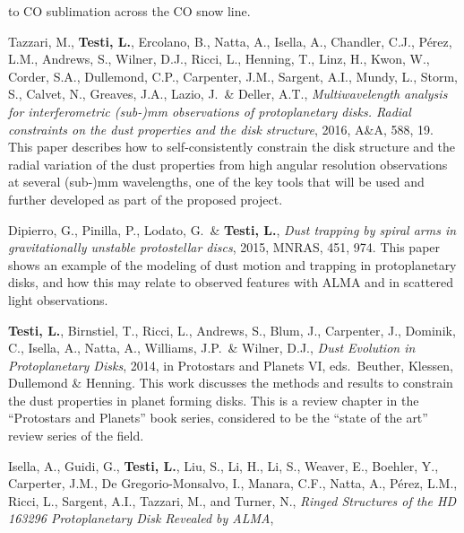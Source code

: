 \documentclass[10pt,fleqn,twoside]{article}
\begin{document}
\begin{literature}
  to CO sublimation across the CO snow line.
\item Tazzari, M., {\bf Testi, L.}, Ercolano, B., Natta, A., Isella, A.,
  Chandler, C.J., Pérez, L.M., Andrews, S., Wilner, D.J., Ricci, L.,
  Henning, T., Linz, H., Kwon, W., Corder, S.A., Dullemond, C.P., Carpenter,
  J.M., Sargent, A.I., Mundy, L., Storm, S., Calvet, N., Greaves, J.A.,
  Lazio, J.\ \& Deller, A.T., {\em Multiwavelength analysis for
    interferometric (sub-)mm observations of protoplanetary disks. Radial
    constraints on the dust properties and the disk structure}, 2016, A\&A,
  588, 19. This paper describes how to self-consistently constrain the disk
  structure and the radial variation of the dust properties from high
  angular resolution observations at several (sub-)mm wavelengths, one of the key 
  tools that will be used and further developed as part of the proposed project.
\item Dipierro, G., Pinilla, P., Lodato, G.\ \& {\bf Testi, L.}, {\em Dust
    trapping by spiral arms in gravitationally unstable protostellar discs},
  2015, MNRAS, 451, 974. This paper shows an example of the modeling of dust
  motion and trapping in protoplanetary disks, and how this may relate to
  observed features with ALMA and in scattered light observations.
\item {\bf Testi, L.}, Birnstiel, T., Ricci, L., Andrews, S., Blum, J.,
  Carpenter, J., Dominik, C., Isella, A., Natta, A., Williams, J.P.\ \&
  Wilner, D.J., {\em Dust Evolution in Protoplanetary Disks}, 2014, in
  Protostars and Planets VI, eds.~Beuther, Klessen, Dullemond \&
  Henning. This work discusses the methods and results to constrain the dust properties
    in planet forming disks. This is a review chapter in the ``Protostars and Planets'' book
  series, considered to be the ``state of the art'' review series of the
  field.
\item Isella, A., Guidi, G., {\bf Testi, L.}, Liu, S., Li, H., Li, S., Weaver, E., 
   Boehler, Y.,  Carperter,  J.M.,  De Gregorio-Monsalvo, I., Manara, C.F.,  Natta, A., 
   P\'erez, L.M., Ricci, L., Sargent, A.I.,  Tazzari, M., and  Turner, N., 
   {\em Ringed Structures of the HD 163296 Protoplanetary Disk Revealed by ALMA}, 

\end{literature}
\end{document}
